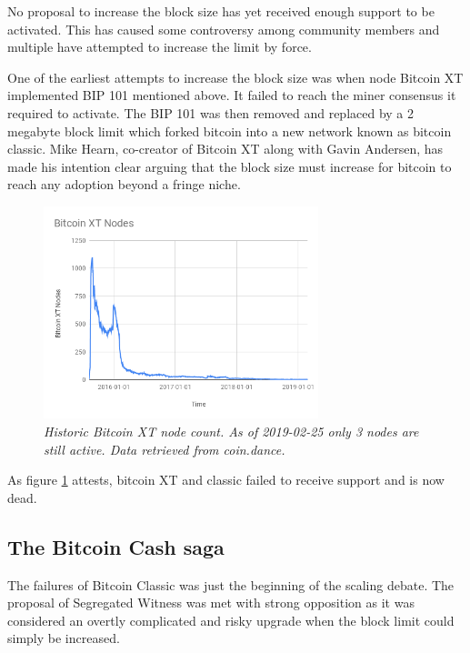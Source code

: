 No proposal to increase the block size has yet received enough support to be activated. This has caused some controversy among community members and multiple have attempted to increase the limit by force. 

One of the earliest attempts to increase the block size was when node Bitcoin XT implemented BIP 101 mentioned above. It failed to reach the miner consensus it required to activate. The BIP 101 was then removed and replaced by a 2 megabyte block limit which forked bitcoin into a new network known as bitcoin classic. Mike Hearn, co-creator of Bitcoin XT along with Gavin Andersen, has made his intention clear arguing that the block size must increase for bitcoin to reach any adoption beyond a fringe niche\cite{hearn:classic}. 

\begin{figure}[!htb]
	\hspace*{-0.7cm} 
	\centering
	\includegraphics[width=8cm]{external/Bitcoin_XT_Nodes.png}
	\caption{\textit{Historic Bitcoin XT node count. As of 2019-02-25 only 3 nodes are still active. Data retrieved from coin.dance\cite{coin:dance}.}}
	\label{fig:xt_nodes}
	\hspace*{2mm} 	
\end{figure}

As figure \ref{fig:xt_nodes} attests, bitcoin XT and classic failed to receive support and is now dead.

\subsection{The Bitcoin Cash saga}

The failures of Bitcoin Classic was just the beginning of the scaling debate. The proposal of Segregated Witness\cite{bip:0141:segwit} was met with strong opposition as it was considered an overtly complicated and risky upgrade when the block limit could simply be increased. 

